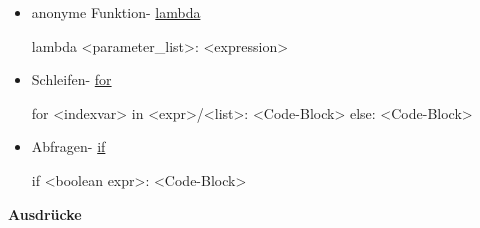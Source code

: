 \documentclass[a4paper,9pt,DIV15,twocolumn]{scrartcl}
\begin{document}
\begin{itemize}
 \item anonyme Funktion- \href{http://docs.python.org/howto/functional.html#small-functions-and-the-lambda-expression}{lambda}
\begin{sagein}
lambda <parameter_list>: <expression> 
\end{sagein}
 \item Schleifen- \href{http://docs.python.org/tutorial/controlflow.html#for-statements}{for}
\begin{sagein}
for <indexvar> in <expr>/<list>:
    <Code-Block>
else:
    <Code-Block>
\end{sagein}
 \item Abfragen- \href{http://docs.python.org/reference/compound_stmts.html#the-if-statement}{if}
\begin{sagein}
if <boolean expr>:
    <Code-Block>
\end{sagein}

\end{itemize}

\textbf{Ausdrücke}
\end{document}

